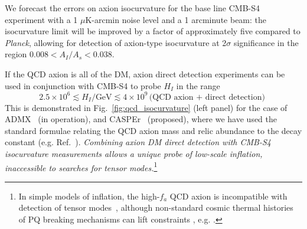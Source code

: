 We forecast the errors on axion isocurvature for the base line CMB-S4 experiment with a 1 $\mu$K-arcmin noise level and a 1 arcminute beam: the isocurvature limit will be improved by a factor of approximately five compared to \emph{Planck}, allowing for detection of axion-type isocurvature at 2$\sigma$ significance in the region $0.008<A_I/A_s<0.038$.

If the QCD axion is all of the DM, axion direct detection experiments can be used in conjunction with CMB-S4 to probe $H_I$ in the range
\begin{equation}
 2.5\times 10^6\lesssim H_I/\text{GeV}\lesssim 4\times 10^9\, 
\text{(QCD axion + direct detection)}\, \,
\end{equation}
This is demonstrated in Fig.~\ref{fig:qcd_isocurvature} (left panel) for the case of ADMX~\cite{Asztalos:2009yp} (in operation), and CASPEr~\cite{Budker:2013hfa} (proposed), where we have used the standard formulae relating the QCD axion mass and relic abundance to the decay constant (e.g. Ref.~\cite{Fox:2004kb}). \emph{Combining axion DM direct detection with CMB-S4 isocurvature measurements allows a unique probe of low-scale inflation, inaccessible to searches for tensor modes.}\footnote{In simple models of inflation, the high-$f_a$ QCD axion is incompatible with detection of tensor modes~\cite{Fox:2004kb,Hertzberg:2008wr,Visinelli:2014twa,Marsh:2014qoa,Visinelli:2014twa}, although non-standard cosmic thermal histories of PQ breaking mechanisms can lift constraints , e.g. \cite{Higaki:2014ooa,Fairbairn:2014zta,Nomura:2015xil}.}

